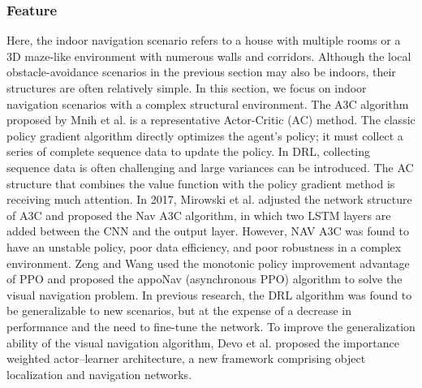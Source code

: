 \subsubsection{Feature}
Here, the indoor navigation scenario refers to a house with multiple rooms or a 3D maze-like environment with numerous walls and corridors. Although the local obstacle-avoidance scenarios in the previous section may also be indoors, their structures are often relatively simple. In this section, we focus on indoor navigation scenarios with a complex structural environment. 
The A3C algorithm proposed by Mnih et al.\cite{mnih2016} is a representative Actor-Critic (AC) method. The classic policy gradient algorithm directly optimizes the agent’s policy; it must collect a series of complete sequence data to update the policy. In DRL, collecting sequence data is often challenging and large variances can be introduced. The AC structure that combines the value function with the policy gradient method is receiving much attention.
In 2017, Mirowski et al.\cite{mirowski2016} adjusted the network structure of A3C and proposed the Nav A3C algorithm, in which two LSTM layers are added between the CNN and the output layer. However, NAV A3C was found to have an unstable policy, poor data efficiency, and poor robustness in a complex environment. Zeng and Wang\cite{zeng2020} used the monotonic policy improvement advantage of PPO and proposed the appoNav (asynchronous PPO) algorithm to solve the visual navigation problem.
In previous research\cite{zhu2017}, the DRL algorithm was found to be generalizable to new scenarios, but at the expense of a decrease in performance and the need to fine-tune the network. To improve the generalization ability of the visual navigation algorithm, Devo et al.\cite{devo2020} proposed the importance weighted actor–learner architecture, a new framework comprising object localization and navigation networks.


